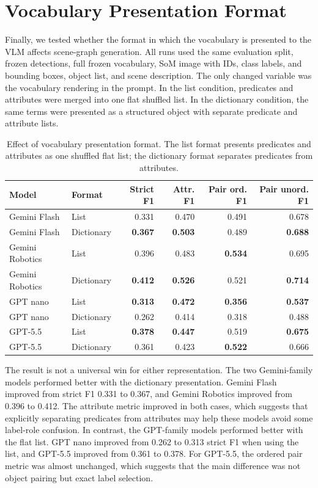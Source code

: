 \section{Vocabulary Presentation Format}

Finally, we tested whether the format in which the vocabulary is presented to the VLM affects scene-graph generation. All runs used the same evaluation split, frozen detections, full frozen vocabulary, SoM image with IDs, class labels, and bounding boxes, object list, and scene description. The only changed variable was the vocabulary rendering in the prompt. In the list condition, predicates and attributes were merged into one flat shuffled list. In the dictionary condition, the same terms were presented as a structured object with separate predicate and attribute lists.

\begin{table}[!htbp]
\centering
\scriptsize
\caption{Effect of vocabulary presentation format. The list format presents predicates and attributes as one shuffled flat list; the dictionary format separates predicates from attributes.}\label{tab:vocab-presentation}
\begin{tabular}{llrrrr}
\toprule
Model & Format & Strict F1 & Attr. F1 & Pair ord. F1 & Pair unord. F1 \\
\midrule
Gemini Flash & List & 0.331 & 0.470 & 0.491 & 0.678 \\
Gemini Flash & Dictionary & \textbf{0.367} & \textbf{0.503} & 0.489 & \textbf{0.688} \\
Gemini Robotics & List & 0.396 & 0.483 & \textbf{0.534} & 0.695 \\
Gemini Robotics & Dictionary & \textbf{0.412} & \textbf{0.526} & 0.521 & \textbf{0.714} \\
GPT nano & List & \textbf{0.313} & \textbf{0.472} & \textbf{0.356} & \textbf{0.537} \\
GPT nano & Dictionary & 0.262 & 0.414 & 0.318 & 0.488 \\
GPT-5.5 & List & \textbf{0.378} & \textbf{0.447} & 0.519 & \textbf{0.675} \\
GPT-5.5 & Dictionary & 0.361 & 0.423 & \textbf{0.522} & 0.666 \\
\bottomrule
\end{tabular}
\end{table}

The result is not a universal win for either representation. The two Gemini-family models performed better with the dictionary presentation. Gemini Flash improved from strict F1 0.331 to 0.367, and Gemini Robotics improved from 0.396 to 0.412. The attribute metric improved in both cases, which suggests that explicitly separating predicates from attributes may help these models avoid some label-role confusion. In contrast, the GPT-family models performed better with the flat list. GPT nano improved from 0.262 to 0.313 strict F1 when using the list, and GPT-5.5 improved from 0.361 to 0.378. For GPT-5.5, the ordered pair metric was almost unchanged, which suggests that the main difference was not object pairing but exact label selection.

